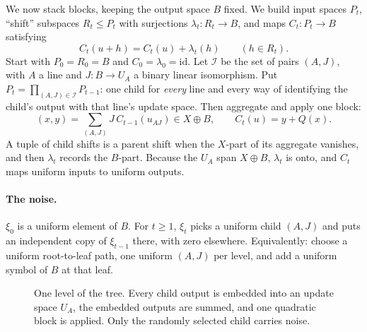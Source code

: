 \documentclass[11pt]{article}
\theoremstyle{definition}
\theoremstyle{remark}
\begin{document}
We now stack blocks, keeping the output space $B$ fixed. We build input spaces
$P_t$, ``shift'' subspaces $R_t\le P_t$ with surjections
$\lambda_t\colon R_t\to B$, and maps $C_t\colon P_t\to B$ satisfying
\begin{equation}\label{eq:tree-equiv}
C_t(u+h)=C_t(u)+\lambda_t(h)\qquad(h\in R_t).
\end{equation}
Start with $P_0=R_0=B$ and $C_0=\lambda_0=\mathrm{id}$. Let $\mathcal I$ be the
set of pairs $(A,J)$, with $A$ a line and $J\colon B\to U_A$ a binary linear
isomorphism. Put $P_t=\prod_{(A,J)\in\mathcal I}P_{t-1}$: one child for
\emph{every} line and every way of identifying the child's output with that
line's update space. Then aggregate and apply one block:
\[
(x,y)=\sum_{(A,J)}J\,C_{t-1}(u_{AJ})\in X\oplus B,\qquad C_t(u)=y+Q(x).
\]
A tuple of child shifts is a parent shift when the $X$-part of its aggregate
vanishes, and then $\lambda_t$ records the $B$-part. Because the $U_A$ span
$X\oplus B$, $\lambda_t$ is onto, and $C_t$ maps uniform inputs to uniform
outputs.

\paragraph{The noise.} $\xi_0$ is a uniform element of $B$. For $t\ge1$, $\xi_t$
picks a uniform child $(A,J)$ and puts an independent copy of $\xi_{t-1}$
there, with zero elsewhere. Equivalently: choose a uniform root-to-leaf path,
one uniform $(A,J)$ per level, and add a uniform symbol of $B$ at that leaf.

\begin{figure}[t]
\centering
{}
\caption{One level of the tree. Every child output is embedded into an update
space $U_A$, the embedded outputs are summed, and one quadratic block is applied.
Only the randomly selected child carries noise.}
\label{fig:tree}
\end{figure}
\end{document}
